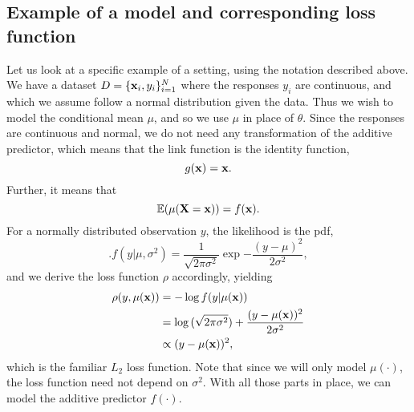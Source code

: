 \subsection{Example of a model and corresponding loss function}
Let us look at a specific example of a setting, using the notation described above. We have a dataset $D=\{\mathbf{x}_i,y_i\}_{i=1}^N$ where the responses $y_i$ are continuous, and which we assume follow a normal distribution given the data. Thus we wish to model the conditional mean $\mu$, and so we use $\mu$ in place of $\theta$. Since the responses are continuous and normal, we do not need any transformation of the additive predictor, which means that the link function is the identity function,
\begin{equation}
    g(\mathbf{x})=\mathbf{x}.
\end{equation}
Further, it means that
\begin{equation}
    \mathbb{E}(\mu(\mathbf{X}=\mathbf{x}))=f(\mathbf{x}).
\end{equation}
For a normally distributed observation $y$, the likelihood is the pdf,
\begin{equation}
    .f(y|\mu,\sigma^2)=\frac{1}{\sqrt{2\pi\sigma^2}}\exp{-\frac{(y-\mu)^2}{2\sigma^2}},
\end{equation}
and we derive the loss function $\rho$ accordingly, yielding
\begin{align*}
    \rho(y,\mu(\mathbf{x}))&=-\log{f(y|\mu(\mathbf{x}))}\\
    &=\log{(\sqrt{2\pi\sigma^2})}+\frac{(y-\mu(\mathbf{x}))^2}{2\sigma^2} \\
    &\propto(y-\mu(\mathbf{x}))^2,
\end{align*}
which is the familiar $L_2$ loss function. Note that since we will only model $\mu(\cdot)$, the loss function need not depend on $\sigma^2$. With all those parts in place, we can model the additive predictor $f(\cdot)$.

